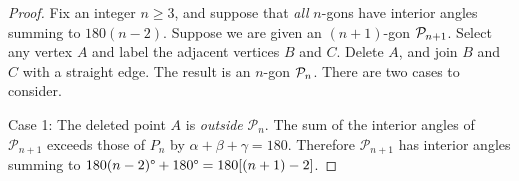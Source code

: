 \begin{proof}
	Fix an integer $n\ge 3$, and suppose that \emph{all} $n$-gons have interior angles summing to $180(n-2)$\textdegree. Suppose we are given an $(n+1)$-gon $\mathcal{P}_{n+1}$. Select any vertex $A$ and label the adjacent vertices $B$ and $C$. Delete $A$, and join $B$ and $C$ with a straight edge. The result is an $n$-gon $\mathcal{P}_n$. There are two cases to consider.\footnotemark{}\par

	\begin{minipage}[t]{0.64\linewidth}\vspace{0pt}
		Case 1: The deleted point $A$ is \emph{outside} $\mathcal{P}_n$. The sum of the interior angles of $\mathcal{P}_{n+1}$ exceeds those of $P_n$ by $\alpha+\beta+\gamma=180$\textdegree. Therefore $\mathcal{P}_{n+1}$ has interior angles summing to $180(n-2)\text{\textdegree}+180\text{\textdegree}=180[(n+1)-2]$\textdegree.\par
	

\end{minipage}
\end{proof}
